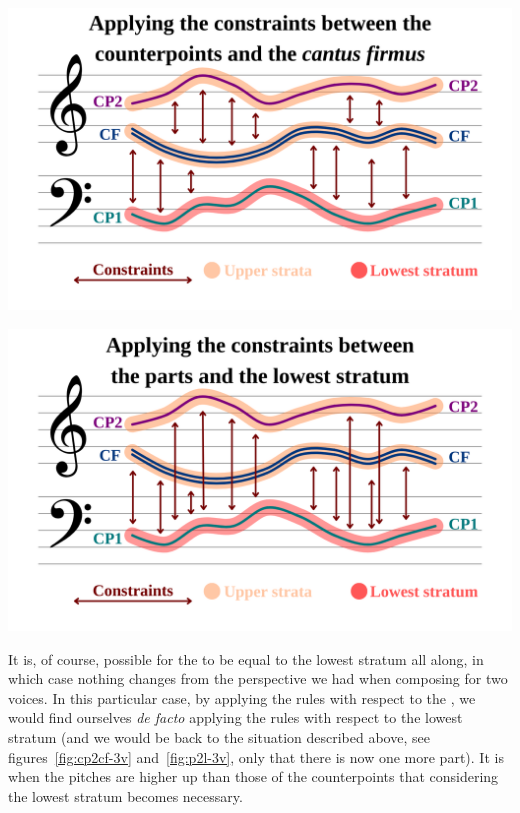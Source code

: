\vspace{.5cm}
\begin{minipage}{0.46\textwidth}
    \centering
    \includegraphics[width=\textwidth]{Images/cp2cf-3v.png}
    \label{fig:cp2cf-3v}
    \end{minipage}
    \hfill
    \begin{minipage}{0.46\textwidth}
      \centering
      \includegraphics[width=\textwidth]{Images/p2l-3v.png}
      \label{fig:p2l-3v}
\end{minipage}
\vspace{.5cm}

It is, of course, possible for the \cfs to be equal to the lowest stratum all along, in which case nothing changes from the perspective we had when composing for two voices. In this particular case, by applying the rules with respect to the \cf, we would find ourselves \textit{de facto} applying the rules with respect to the lowest stratum (and we would be back to the situation described above, see figures~\ref{fig:cp2cf-3v} and~\ref{fig:p2l-3v}, only that there is now one more part). It is when the \cfs pitches are higher up than those of the counterpoints that considering the lowest stratum becomes necessary.

